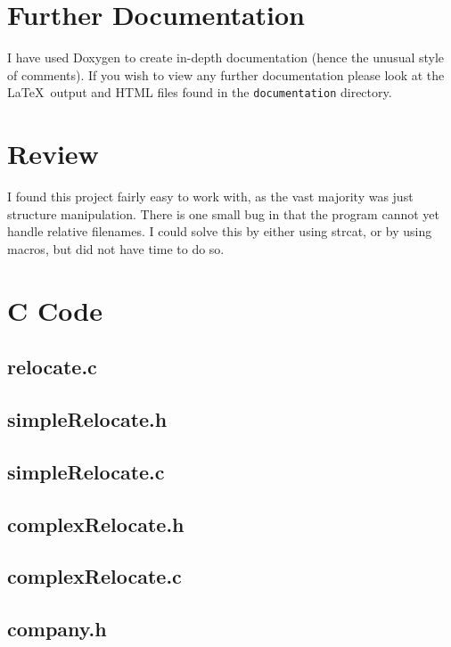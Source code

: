 \documentclass[10pt,letterpaper]{article}
\newcommand{\codepath}{src/}
\begin{document}
  \section{Further Documentation}
    I have used Doxygen to create in-depth documentation (hence the unusual style of comments). If you wish to view any further documentation please look at the \LaTeX\  output and HTML files found in the \verb+documentation+ directory.
  
  \section{Review}
  	I found this project fairly easy to work with, as the vast majority was just structure manipulation. There is one small bug in that the program cannot yet handle relative filenames. I could solve this by either using strcat, or by using macros, but did not have time to do so.
  	  
  \newpage
  
  \section{C Code}
    \subsection{relocate.c}
      
    
    \subsection{simpleRelocate.h}
      
    \subsection{simpleRelocate.c}
      
    
    \subsection{complexRelocate.h}
      
    \subsection{complexRelocate.c}
      
    
    \subsection{company.h}
      
\end{document}
